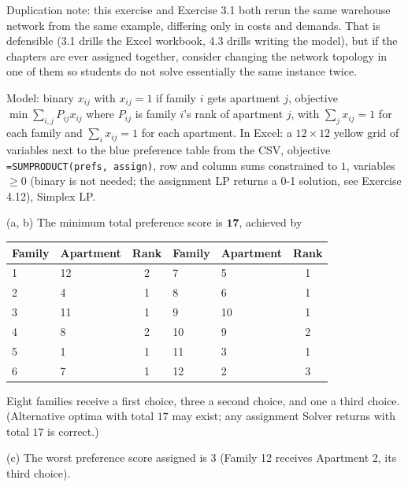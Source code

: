 \begin{qaflag}
Duplication note: this exercise and Exercise 3.1 both rerun the same warehouse network from the same example, differing only in costs and demands. That is defensible (3.1 drills the Excel workbook, 4.3 drills writing the model), but if the chapters are ever assigned together, consider changing the network topology in one of them so students do not solve essentially the same instance twice.
\end{qaflag}


Model: binary $x_{ij}$ with $x_{ij} = 1$ if family $i$ gets apartment $j$, objective $\min \sum_{i,j} P_{ij} x_{ij}$ where $P_{ij}$ is family $i$'s rank of apartment $j$, with $\sum_j x_{ij} = 1$ for each family and $\sum_i x_{ij} = 1$ for each apartment. In Excel: a $12 \times 12$ yellow grid of variables next to the blue preference table from the CSV, objective \texttt{=SUMPRODUCT(prefs, assign)}, row and column sums constrained to $1$, variables $\geq 0$ (binary is not needed; the assignment LP returns a 0-1 solution, see Exercise 4.12), Simplex LP.

(a, b) The minimum total preference score is $\mathbf{17}$, achieved by
\begin{center}
\begin{tabular}{llc|llc}
Family & Apartment & Rank & Family & Apartment & Rank\\
\hline
1 & 12 & 2 & 7 & 5 & 1\\
2 & 4 & 1 & 8 & 6 & 1\\
3 & 11 & 1 & 9 & 10 & 1\\
4 & 8 & 2 & 10 & 9 & 2\\
5 & 1 & 1 & 11 & 3 & 1\\
6 & 7 & 1 & 12 & 2 & 3\\
\end{tabular}
\end{center}
Eight families receive a first choice, three a second choice, and one a third choice. (Alternative optima with total $17$ may exist; any assignment Solver returns with total $17$ is correct.)

(c) The worst preference score assigned is $3$ (Family 12 receives Apartment 2, its third choice).


